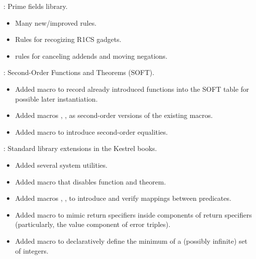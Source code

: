 
\begin{frame}

\implibtitle

:
Prime fields library.
\begin{itemize}
\item Many new/improved rules.
\item Rules for recogizing R1CS gadgets.
\item {} rules for canceling addends and moving negations.
\end{itemize}

\end{frame}


\begin{frame}

\implibtitle

:
Second-Order Functions and Theorems (SOFT).
\begin{itemize}
\item Added macro  to record already introduced functions
      into the SOFT table for possible later instantiation.
\item Added macros , , 
      as second-order versions of the existing macros.
\item Added macro  to introduce second-order equalities.
\end{itemize}

\end{frame}


\begin{frame}

\implibtitle

:
Standard library extensions in the Kestrel books.
\begin{itemize}
\item Added several system utilities.
\item Added macro  that disables function and theorem.
\item Added macros , , 
      to introduce and verify mappings between predicates.
\item Added macro  to mimic  return specifiers
      inside components of  return specifiers
      (particularly, the value component of error triples).
\item Added macro  to declaratively define
      the minimum of a (possibly infinite) set of integers.
\end{itemize}

\end{frame}

